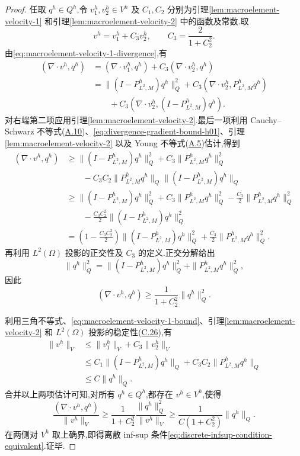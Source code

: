 \begin{proof}
任取 $q^h\in Q^h$,令 $v_1^h,v_2^h\in V^h$ 及 $C_1,C_2$ 分别为引理\ref{lem:macroelement-velocity-1} 和引理\ref{lem:macroelement-velocity-2} 中的函数及常数.取
\[
  v^h=v_1^h+C_3v_2^h,
  \qquad C_3=\frac{2}{1+C_2^2}.
\]
由\cref{eq:macroelement-velocity-1-divergence},有
\[
\begin{aligned}
  (\nabla\cdot v^h,q^h)
  &=(\nabla\cdot v_1^h,q^h)
    +C_3(\nabla\cdot v_2^h,q^h)\\
  &=\|(I-P_{L^2,M}^h)q^h\|_Q^2
    +C_3(\nabla\cdot v_2^h,P_{L^2,M}^h q^h)\\
  &\qquad+C_3(\nabla\cdot v_2^h,(I-P_{L^2,M}^h)q^h).
\end{aligned}
\]
对右端第二项应用引理\ref{lem:macroelement-velocity-2}.最后一项利用 Cauchy--Schwarz 不等式(\hyperref[eq:appendix-a-10]{A.10})、\cref{eq:divergence-gradient-bound-h01}、引理\ref{lem:macroelement-velocity-2} 以及 Young 不等式(\hyperref[eq:appendix-a-5]{A.5})估计,得到
\[
\begin{aligned}
  (\nabla\cdot v^h,q^h)
  &\ge \|(I-P_{L^2,M}^h)q^h\|_Q^2
       +C_3\|P_{L^2,M}^h q^h\|_Q^2\\
  &\qquad-C_3C_2\|P_{L^2,M}^h q^h\|_Q
       \|(I-P_{L^2,M}^h)q^h\|_Q\\
  &\ge \|(I-P_{L^2,M}^h)q^h\|_Q^2
       +C_3\|P_{L^2,M}^h q^h\|_Q^2
       -\frac{C_3}{2}\|P_{L^2,M}^h q^h\|_Q^2\\
  &\qquad-\frac{C_3C_2^2}{2}
       \|(I-P_{L^2,M}^h)q^h\|_Q^2\\
  &=\left(1-\frac{C_3C_2^2}{2}\right)
       \|(I-P_{L^2,M}^h)q^h\|_Q^2
       +\frac{C_3}{2}\|P_{L^2,M}^h q^h\|_Q^2.
\end{aligned}
\]
再利用 $L^2(\Omega)$ 投影的正交性及 $C_3$ 的定义.正交分解给出
\[
  \|q^h\|_Q^2
  =\|(I-P_{L^2,M}^h)q^h\|_Q^2
   +\|P_{L^2,M}^h q^h\|_Q^2,
\]
因此
\[
  (\nabla\cdot v^h,q^h)
  \ge \frac{1}{1+C_2^2}\|q^h\|_Q^2.
\]

利用三角不等式、\cref{eq:macroelement-velocity-1-bound}、引理\ref{lem:macroelement-velocity-2} 和 $L^2(\Omega)$ 投影的稳定性(\hyperref[eq:appendix-c-26]{C.26}),有
\[
\begin{aligned}
  \|v^h\|_V
  &\le \|v_1^h\|_V+C_3\|v_2^h\|_V\\
  &\le C_1\|(I-P_{L^2,M}^h)q^h\|_Q
      +C_3C_2\|P_{L^2,M}^h q^h\|_Q\\
  &\le C\|q^h\|_Q.
\end{aligned}
\]
合并以上两项估计可知,对所有 $q^h\in Q^h$,都存在 $v^h\in V^h$,使得
\[
  \frac{(\nabla\cdot v^h,q^h)}{\|v^h\|_V}
  \ge \frac{1}{1+C_2^2}\frac{\|q^h\|_Q^2}{\|v^h\|_V}
  \ge \frac{1}{C(1+C_2^2)}\|q^h\|_Q.
\]
在两侧对 $V^h$ 取上确界,即得离散 inf-sup 条件\cref{eq:discrete-infsup-condition-equivalent}.证毕.
\end{proof}

